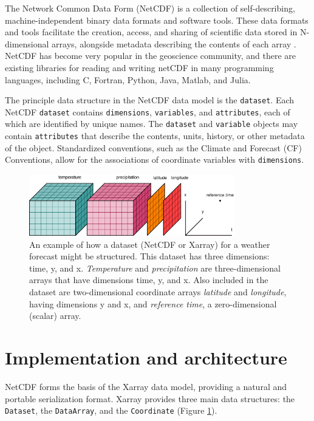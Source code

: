 \documentclass{jors}
\begin{document}
The Network Common Data Form (NetCDF) is a collection of self-describing, machine-independent binary data formats and software tools.
These data formats and tools facilitate the creation, access, and sharing of scientific data stored in N-dimensional arrays, alongside metadata describing the contents of each array \citep{Rew_1990}.
NetCDF has become very popular in the geoscience community, and there are existing libraries for reading and writing netCDF in many programming languages, including C, Fortran, Python, Java, Matlab, and Julia.

The principle data structure in the NetCDF data model is the \verb|dataset|.
Each NetCDF \verb|dataset| contains \verb|dimensions|, \verb|variables|, and \verb|attributes|, each of which are identified by unique names.
The \verb|dataset| and \verb|variable| objects may contain \verb|attributes| that describe the contents, units, history, or other metadata of the object.
Standardized conventions, such as the Climate and Forecast (CF) Conventions, \citep{eaton2003netcdf} allow for the associations of coordinate variables with \verb|dimensions|.

\begin{figure}
	\centering
	\includegraphics[width=0.8\textwidth]{dataset-diagram_original}
	\caption{An example of how a dataset (NetCDF or Xarray) for a weather forecast might be structured.  This dataset has three dimensions: time, y, and x.  \textit{Temperature} and \textit{precipitation} are three-dimensional arrays that have dimensions time, y, and x.  Also included in the dataset are two-dimensional coordinate arrays \textit{latitude} and \textit{longitude}, having dimensions y and x, and \textit{reference time}, a zero-dimensional (scalar) array.}
	\label{fig:dataset_diagram}
\end{figure}

\section*{Implementation and architecture}

NetCDF forms the basis of the Xarray data model, providing a natural and portable serialization format.
Xarray provides three main data structures: the \verb|Dataset|, the \verb|DataArray|, and the \verb|Coordinate| (Figure \ref{fig:dataset_diagram}).
\end{document}
